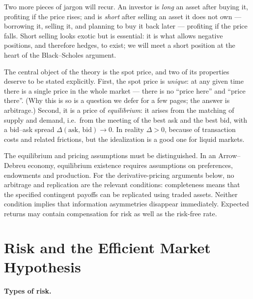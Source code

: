 Two more pieces of jargon will recur.
An investor is \emph{long} an asset after buying it, profiting if the price rises; and is \emph{short} after selling an asset it does not own --- borrowing it, selling it, and planning to buy it back later --- profiting if the price falls.
Short selling looks exotic but is essential: it is what allows negative positions, and therefore hedges, to exist; we will meet a short position at the heart of the Black--Scholes argument.

The central object of the theory is the spot price, and two of its properties deserve to be stated explicitly.
First, the spot price is \emph{unique}: at any given time there is a single price in the whole market --- there is no ``price here'' and ``price there''.
(Why this is so is a question we defer for a few pages; the answer is arbitrage.)
Second, it is a price of \emph{equilibrium}: it arises from the matching of supply and demand, i.e.\ from the meeting of the best ask and the best bid, with a bid--ask spread $\Delta(\text{ask},\,\text{bid})\to 0$.
In reality $\Delta>0$, because of transaction costs and related frictions, but the idealization is a good one for liquid markets.

The equilibrium and pricing assumptions must be distinguished.
In an Arrow--Debreu economy, equilibrium existence requires assumptions on preferences, endowments and production.
For the derivative-pricing arguments below, no arbitrage and replication are the relevant conditions: completeness means that the specified contingent payoffs can be replicated using traded assets.
Neither condition implies that information asymmetries disappear immediately.
Expected returns may contain compensation for risk as well as the risk-free rate.

\section{Risk and the Efficient Market Hypothesis}

\paragraph*{Types of risk.}


